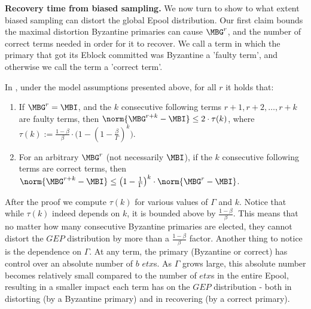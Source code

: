 \textbf{Recovery time from biased sampling.}
We now turn to show to what extent biased sampling can distort the global Epool distribution. Our first claim bounds the maximal distortion Byzantine primaries can cause $\MBG^r$, and the number of correct terms needed in order for it to recover. We call a term in which the primary that got its Eblock committed was Byzantine a 'faulty term', and otherwise we call the term a 'correct term'.
\begin{claim}  In \nameNS, under the model assumptions presented above, for all $r$ it holds that: 
	\begin{enumerate}
	\item If $\MBG^r=\MBI$, and the $k$ consecutive following terms $r+1,r+2,\dots,r+k$ are faulty terms, then $\norm{\MBG^{r+k}-\MBI}\leq 2\cdot \tau(k)$, where $\tau(k):=\frac{1-\beta}{\beta}\cdot \Bigg(1-\left(1-\frac{\beta}{\Gamma}\right)^k\Bigg)$.
	\item  For an arbitrary $\MBG^r$ (not necessarily $\MBI$), if the $k$ consecutive following terms are correct terms, then $\norm{\MBG^{r+k}-\MBI}\leq \left(1-\frac{1}{\Gamma}\right)^k\cdot \norm{\MBG^r-\MBI}$.
	\end{enumerate}
\end{claim}
\noindent After the proof we compute $\tau(k)$ for various values of $\Gamma$ and $k$. Notice that while $\tau(k)$ indeed depends on $k$, it is bounded above by $\frac{1-\beta}{\beta}$. This means that no matter how many consecutive Byzantine primaries are elected, they cannot distort the $GEP$ distribution by more than a $\frac{1-\beta}{\beta}$ factor. Another thing to notice is the dependence on $\Gamma$. At any term, the primary (Byzantine or correct) has control over an absolute number of $b$ $etx$s. As $\Gamma$ grows large, this absolute number becomes relatively small compared to the number of $etx$s in the entire Epool, resulting in a smaller impact each term has on the $GEP$ distribution - both in distorting (by a Byzantine primary) and in recovering (by a correct primary). 
